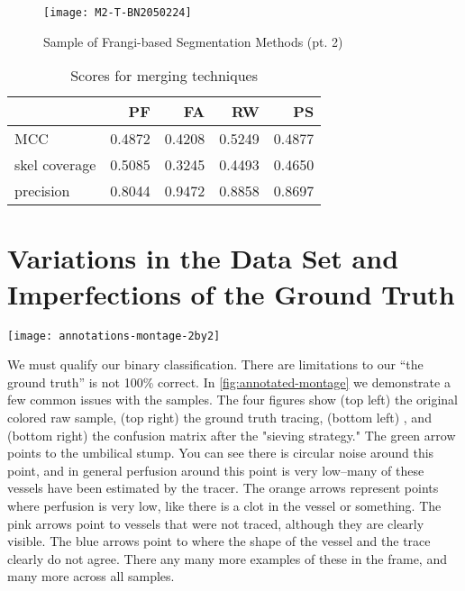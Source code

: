 \begin{figure}[p] \centering
	\texttt{[image: M2-T-BN2050224]}
	\caption{Sample of Frangi-based Segmentation Methods (pt. 2)}
\end{figure}

\begin{table}[p]\centering
	\begin{tabular}{l|rrrr}
		{} &        PF &        FA &        RW &        PS \\
		\hline
		MCC           &  0.4872 &  0.4208 &  0.5249 &  0.4877 \\
		skel coverage &  0.5085 &  0.3245 &  0.4493 &  0.4650 \\
		precision     &  0.8044 &  0.9472 &  0.8858 &  0.8697 \\
	\end{tabular}
	\caption{Scores for merging techniques}
\end{table}

\section{Variations in the Data Set and Imperfections of the Ground Truth} \label{sec:NCS-dataset-issues}
\begin{sidewaysfigure}
	\texttt{[image: annotations-montage-2by2]}
	\caption{Issues with the ground truth manifesting in Frangi vesselness scores}
	\label{fig:annotated-montage}
\end{sidewaysfigure}

We must qualify our binary classification. There are limitations to our ``the ground truth'' is not 100\% correct. In \cref{fig:annotated-montage} we demonstrate a few common issues with the samples. The four figures show (top left) the original colored raw sample, (top right) the ground truth tracing, (bottom left) \Vmax, and (bottom right) the confusion matrix after the "sieving strategy."  The green arrow points to the umbilical stump. You can see there is circular noise around this point, and in general perfusion around this point is very low--many of these vessels have been estimated by the tracer. The orange arrows represent points where perfusion is very low, like there is a clot in the vessel or something. The pink arrows point to vessels that were not traced, although they are clearly visible. The blue arrows point to where the shape of the vessel and the trace clearly do not agree. There any many more examples of these in the frame, and many more across all samples.

